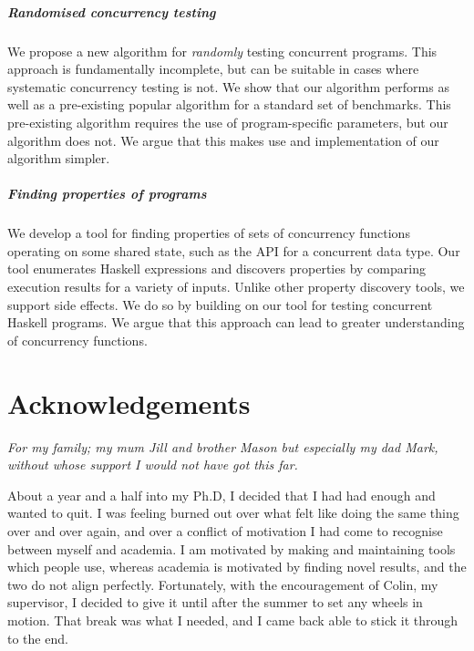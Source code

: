 \paragraph{Randomised concurrency testing}
We propose a new algorithm for \emph{randomly} testing concurrent
programs.  This approach is fundamentally incomplete, but can be
suitable in cases where systematic concurrency testing is not.  We
show that our algorithm performs as well as a pre-existing popular
algorithm for a standard set of benchmarks.  This pre-existing
algorithm requires the use of program-specific parameters, but our
algorithm does not.  We argue that this makes use and implementation
of our algorithm simpler.

\paragraph{Finding properties of programs}
We develop a tool for finding properties of sets of concurrency
functions operating on some shared state, such as the API for a
concurrent data type.  Our tool enumerates Haskell expressions and
discovers properties by comparing execution results for a variety of
inputs.  Unlike other property discovery tools, we support side
effects.  We do so by building on our tool for testing concurrent
Haskell programs.  We argue that this approach can lead to greater
understanding of concurrency functions.

\makeatletter\renewcommand{}\makeatother
\tableofcontents
\listoffigures
\listoftables
\listoflistings

\chapter*{Acknowledgements}

\begin{displayquote}\itshape
  For my family; my mum Jill and brother Mason but especially my dad
  Mark, without whose support I would not have got this far.
\end{displayquote}

\noindent
About a year and a half into my Ph.D, I decided that I had had enough
and wanted to quit.  I was feeling burned out over what felt like
doing the same thing over and over again, and over a conflict of
motivation I had come to recognise between myself and academia.  I am
motivated by making and maintaining tools which people use, whereas
academia is motivated by finding novel results, and the two do not
align perfectly.  Fortunately, with the encouragement of Colin, my
supervisor, I decided to give it until after the summer to set any
wheels in motion.  That break was what I needed, and I came back able
to stick it through to the end.

